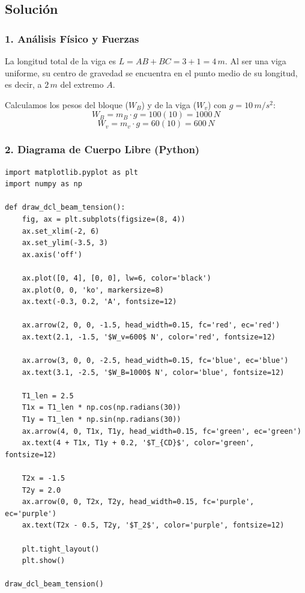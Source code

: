 \documentclass[12pt, a4paper]{article}
\begin{document}
\subsection*{Solución}

\subsubsection*{1. Análisis Físico y Fuerzas}
La longitud total de la viga es $L = AB + BC = 3 + 1 = 4 \, \si{m}$.
Al ser una viga uniforme, su centro de gravedad se encuentra en el punto medio de su longitud, es decir, a $2 \, \si{m}$ del extremo $A$.

Calculamos los pesos del bloque ($W_B$) y de la viga ($W_v$) con $g = 10 \, \si{m/s^2}$:
$$W_B = m_B \cdot g = 100(10) = 1000 \, \si{N}$$
$$W_v = m_v \cdot g = 60(10) = 600 \, \si{N}$$

\subsubsection*{2. Diagrama de Cuerpo Libre (Python)}

\begin{lstlisting}
import matplotlib.pyplot as plt
import numpy as np

def draw_dcl_beam_tension():
    fig, ax = plt.subplots(figsize=(8, 4))
    ax.set_xlim(-2, 6)
    ax.set_ylim(-3.5, 3)
    ax.axis('off')
    
    ax.plot([0, 4], [0, 0], lw=6, color='black')
    ax.plot(0, 0, 'ko', markersize=8)
    ax.text(-0.3, 0.2, 'A', fontsize=12)
    
    ax.arrow(2, 0, 0, -1.5, head_width=0.15, fc='red', ec='red')
    ax.text(2.1, -1.5, '$W_v=600$ N', color='red', fontsize=12)
    
    ax.arrow(3, 0, 0, -2.5, head_width=0.15, fc='blue', ec='blue')
    ax.text(3.1, -2.5, '$W_B=1000$ N', color='blue', fontsize=12)
    
    T1_len = 2.5
    T1x = T1_len * np.cos(np.radians(30))
    T1y = T1_len * np.sin(np.radians(30))
    ax.arrow(4, 0, T1x, T1y, head_width=0.15, fc='green', ec='green')
    ax.text(4 + T1x, T1y + 0.2, '$T_{CD}$', color='green', fontsize=12)
    
    T2x = -1.5
    T2y = 2.0
    ax.arrow(0, 0, T2x, T2y, head_width=0.15, fc='purple', ec='purple')
    ax.text(T2x - 0.5, T2y, '$T_2$', color='purple', fontsize=12)

    plt.tight_layout()
    plt.show()

draw_dcl_beam_tension()
\end{lstlisting}
\end{document}
